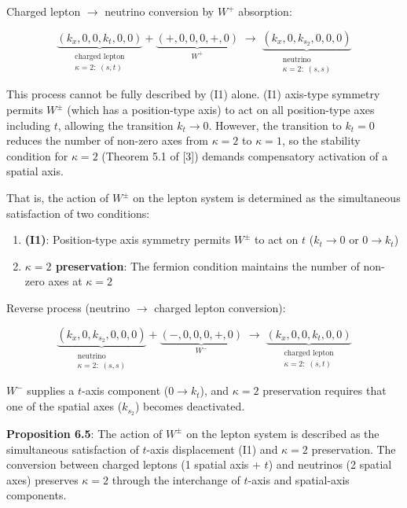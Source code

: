 \documentclass[
  a4paper,11pt]{article}
\providecommand{\tightlist}{%
  \setlength{\itemsep}{0pt}\setlength{\parskip}{0pt}}
\theoremstyle{definition}
\theoremstyle{remark}
\begin{document}
Charged lepton \(\to\) neutrino conversion by \(W^+\) absorption:

\[\underbrace{(k_x, 0, 0, k_t, 0, 0)}_{\substack{\text{charged lepton} \\ \kappa = 2:\; (s, t)}} + \underbrace{(+, 0, 0, 0, +, 0)}_{W^+} \;\longrightarrow\; \underbrace{(k_x, 0, k_{s_2}, 0, 0, 0)}_{\substack{\text{neutrino} \\ \kappa = 2:\; (s, s)}}\]

This process cannot be fully described by (I1) alone. (I1) axis-type
symmetry permits \(W^{\pm}\) (which has a position-type axis) to act on
all position-type axes including \(t\), allowing the transition
\(k_t \to 0\). However, the transition to \(k_t = 0\) reduces the number
of non-zero axes from \(\kappa = 2\) to \(\kappa = 1\), so the stability
condition for \(\kappa = 2\) (Theorem 5.1 of {[}3{]}) demands
compensatory activation of a spatial axis.

That is, the action of \(W^{\pm}\) on the lepton system is determined as
the simultaneous satisfaction of two conditions:

\begin{enumerate}
\def\labelenumi{\arabic{enumi}.}
\tightlist
\item
  \textbf{(I1)}: Position-type axis symmetry permits \(W^{\pm}\) to act
  on \(t\) (\(k_t \to 0\) or \(0 \to k_t\))
\item
  \textbf{\(\kappa = 2\) preservation}: The fermion condition maintains
  the number of non-zero axes at \(\kappa = 2\)
\end{enumerate}

Reverse process (neutrino \(\to\) charged lepton conversion):

\[\underbrace{(k_x, 0, k_{s_2}, 0, 0, 0)}_{\substack{\text{neutrino} \\ \kappa = 2:\; (s, s)}} + \underbrace{(-, 0, 0, 0, +, 0)}_{W^-} \;\longrightarrow\; \underbrace{(k_x, 0, 0, k_t, 0, 0)}_{\substack{\text{charged lepton} \\ \kappa = 2:\; (s, t)}}\]

\(W^-\) supplies a \(t\)-axis component (\(0 \to k_t\)), and
\(\kappa = 2\) preservation requires that one of the spatial axes
(\(k_{s_2}\)) becomes deactivated.

\textbf{Proposition 6.5}: The action of \(W^{\pm}\) on the lepton system
is described as the simultaneous satisfaction of \(t\)-axis displacement
(I1) and \(\kappa = 2\) preservation. The conversion between charged
leptons (1 spatial axis + \(t\)) and neutrinos (2 spatial axes)
preserves \(\kappa = 2\) through the interchange of \(t\)-axis and
spatial-axis components.
\end{document}
